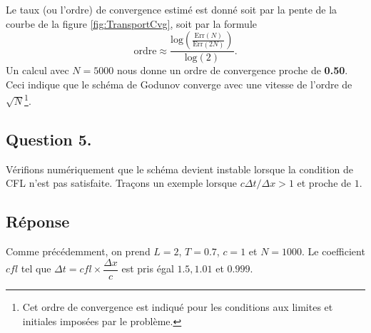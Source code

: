 \documentclass[
	french,
	11pt, %
]{fphw}
\begin{document}
\noindent Le taux (ou l'ordre) de convergence estimé est donné soit par la pente de la courbe de la figure \ref{fig:TransportCvg}, soit par la formule $$ \text{ordre} \approx \frac{\text{log}\left(\frac{\text{Err}(N)}{\text{Err}(2N) }\right)}{\text{log}(2)}. $$ Un calcul avec $N=5000$ nous donne un ordre de convergence proche de \textbf{0.50}. Ceci indique que le schéma de Godunov converge avec une vitesse de l'ordre de $\sqrt{N}$\footnote{Cet ordre de convergence est indiqué pour les conditions aux limites et initiales imposées par le problème.}.


\subsection*{Question 5.}
\begin{problem}
	Vérifions numériquement que le schéma devient instable lorsque la condition de CFL n'est pas satisfaite. Traçons un exemple lorsque $c \Delta t / \Delta x > 1$ et proche de $1$.
\end{problem}

\subsection*{Réponse}
Comme précédemment, on prend $L = 2$, $T=0.7$, $c=1$ et $N=1000$. Le coefficient $cfl$ tel que $\Delta t = cfl \times \dfrac{\Delta x}{c}$ est pris égal $1.5, 1.01$ et $0.999$.
\end{document}
